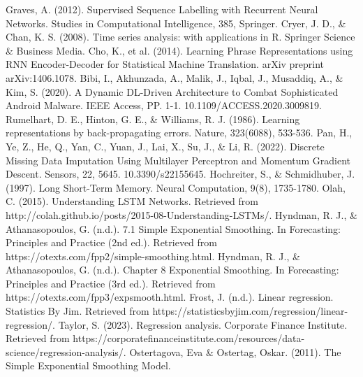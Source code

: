 \documentclass{ieeeojies}
\begin{document}
\begin{thebibliography}{00}
   Graves, A. (2012). Supervised Sequence Labelling with Recurrent Neural Networks. Studies in Computational Intelligence, 385, Springer.
   Cryer, J. D., \& Chan, K. S. (2008). Time series analysis: with applications in R. Springer Science \& Business Media.
   Cho, K., et al. (2014). Learning Phrase Representations using RNN Encoder-Decoder for Statistical Machine Translation. arXiv preprint arXiv:1406.1078.
   Bibi, I., Akhunzada, A., Malik, J., Iqbal, J., Musaddiq, A., \& Kim, S. (2020). A Dynamic DL-Driven Architecture to Combat Sophisticated Android Malware. IEEE Access, PP. 1-1. 10.1109/ACCESS.2020.3009819.
   Rumelhart, D. E., Hinton, G. E., \& Williams, R. J. (1986). Learning representations by back-propagating errors. Nature, 323(6088), 533-536.
   Pan, H., Ye, Z., He, Q., Yan, C., Yuan, J., Lai, X., Su, J., \& Li, R. (2022). Discrete Missing Data Imputation Using Multilayer Perceptron and Momentum Gradient Descent. Sensors, 22, 5645. 10.3390/s22155645.
   Hochreiter, S., \& Schmidhuber, J. (1997). Long Short-Term Memory. Neural Computation, 9(8), 1735-1780.
   Olah, C. (2015). Understanding LSTM Networks. Retrieved from http://colah.github.io/posts/2015-08-Understanding-LSTMs/.
   Hyndman, R. J., \& Athanasopoulos, G. (n.d.). 7.1 Simple Exponential Smoothing. In Forecasting: Principles and Practice (2nd ed.). Retrieved from https://otexts.com/fpp2/simple-smoothing.html.
   Hyndman, R. J., \& Athanasopoulos, G. (n.d.). Chapter 8 Exponential Smoothing. In Forecasting: Principles and Practice (3rd ed.). Retrieved from https://otexts.com/fpp3/expsmooth.html.
   Frost, J. (n.d.). Linear regression. Statistics By Jim. Retrieved from https://statisticsbyjim.com/regression/linear-regression/.
   Taylor, S. (2023). Regression analysis. Corporate Finance Institute. Retrieved from https://corporatefinanceinstitute.com/resources/data-science/regression-analysis/.
   Ostertagova, Eva \& Ostertag, Oskar. (2011). The Simple Exponential Smoothing Model. 
\end{thebibliography}



\EOD
\end{document}
